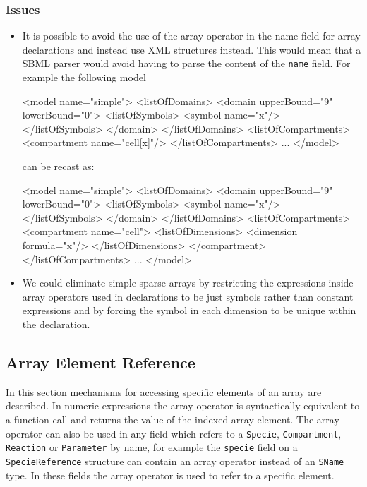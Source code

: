 \documentclass{cekarticle}
\begin{document}
\subsubsection{Issues}
\begin{itemize}
\item
It is possible to avoid the use of the array operator in the name
field for array declarations and instead use XML structures
instead.  This would mean that a SBML parser would avoid having
to parse the content of the \texttt{name} field.  For example the
following model
\begin{example}
<model name="simple">
    <listOfDomains>
        <domain upperBound="9" lowerBound="0">
            <listOfSymbols>
                <symbol name="x"/>
            </listOfSymbols>
        </domain>
    </listOfDomains>
    <listOfCompartments>
        <compartment name="cell[x]"/>
    </listOfCompartments>
    ...
</model>
\end{example}
can be recast as:
\begin{example}
<model name="simple">
    <listOfDomains>
        <domain upperBound="9" lowerBound="0">
            <listOfSymbols>
                <symbol name="x"/>
            </listOfSymbols>
        </domain>
    </listOfDomains>
    <listOfCompartments>
        <compartment name="cell">
            <listOfDimensions>
                <dimension formula="x"/>
            </listOfDimensions>
        </compartment>
    </listOfCompartments>
    ...
</model>
\end{example}

\item
We could eliminate simple sparse arrays by restricting the
expressions inside array operators used in declarations to be
just symbols rather than constant expressions and by forcing the
symbol in each dimension to be unique within the declaration.
\end{itemize}

\subsection{Array Element Reference}
In this section mechanisms for accessing specific elements of an
array are described. In numeric expressions the array operator is
syntactically equivalent to a function call and returns the value
of the indexed array element. The array operator can also be used
in any field which refers to a \texttt{Specie},
\texttt{Compartment}, \texttt{Reaction} or \texttt{Parameter} by
name, for example the \texttt{specie} field on a
\texttt{SpecieReference} structure can contain an array operator
instead of an \texttt{SName} type.  In these fields the array
operator is used to refer to a specific element.
\end{document}
